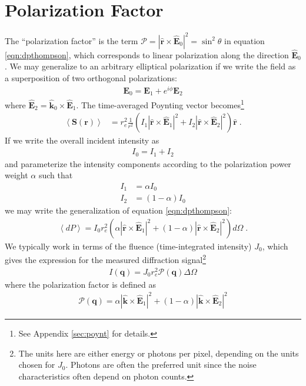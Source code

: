 \documentclass[12pt]{article}
\renewcommand{\vec}[1]{\boldsymbol{#1}}
\newcommand{\hvec}[1]{\hat{\vec{#1}}}
\newcommand{\avg}[1]{\left\langle #1 \right\rangle}
\begin{document}
\section{Polarization Factor}

The ``polarization factor'' is the term $\mathcal{P}=| \hvec{r} 
\times  \hvec{E}_0 |^2=\sin^2\theta$ in equation \ref{eqn:dpthompson}, which
corresponds to linear polarization along the direction $\hvec{E}_0$.  We may 
generalize to an arbitrary elliptical polarization if we write the field as a 
superposition of two orthogonal polarizations:
\begin{align}
 \vec{E}_0 = \vec{E}_1 + e^{i\phi}\vec{E}_2 
\end{align}
where $\hvec{E}_2 = \hvec{k}_0 \times \hvec{E}_1$.  The time-averaged Poynting 
vector becomes\footnote{See Appendix \ref{sec:poynt} for details.}
\begin{align}
\avg{\vec{S}(\vec{r})} &= r_e^2 \frac{1}{r^2} (I_1 | \hvec{r} \times  \hvec{E}_1 
|^2 + I_2 | \hvec{r} \times  \hvec{E}_2 |^2)  \hvec{r} \;. 
\end{align}
If we write the overall incident intensity as 
\begin{align}
 I_0 = I_1 + I_2 
\end{align}
and parameterize the intensity components according to the polarization 
power weight $\alpha$ such that
\begin{align}
 I_1 &=\alpha I_0\\
 I_2 &= (1-\alpha)I_0
\end{align}
we may write the generalization of equation \ref{eqn:dpthompson}:
\begin{align}\label{eqn:genthompson}
\avg{dP} = I_0 r_e^2  (\alpha | \hvec{r} \times  \hvec{E}_1 |^2 + (1-\alpha) 
| \hvec{r} \times  \hvec{E}_2 |^2)  d\Omega\;.
\end{align}
We typically work in terms of the fluence (time-integrated intensity) $J_0$, 
which gives the expression for the measured diffraction signal\footnote{The 
units here are either energy or photons per pixel, depending on the units 
chosen for $J_0$.  Photons are often the preferred unit since the noise 
characteristics often depend on photon counts.}
\begin{align}
    I(\vec{q}) = J_0 r_e^2  \mathcal{P}(\vec{q}) \Delta \Omega
\end{align}
where the polarization factor is defined as
\begin{align}\label{eqn:goodpol}
 \mathcal{P}(\vec{q}) = \alpha | \hvec{k} \times  \hvec{E}_1 |^2 + (1-\alpha) | 
\hvec{k} \times \hvec{E}_2 |^2
\end{align}
\end{document}
